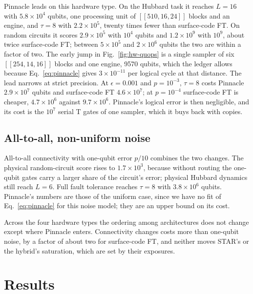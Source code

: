 \documentclass[11pt]{article}
\newcommand{\eps}{\epsilon}
\begin{document}
Pinnacle leads on this hardware type. On the Hubbard task it reaches $L=16$ with
$5.8\times10^4$ qubits, one processing unit of $[[510,16,24]]$ blocks and an
engine, and $\tau=8$ with $2.2\times10^5$, twenty times fewer than surface-code
FT. On random circuits it scores $2.9\times10^5$ with $10^4$ qubits and
$1.2\times10^9$ with $10^9$, about twice surface-code FT; between $5\times10^5$
and $2\times10^6$ qubits the two are within a factor of two. The early jump in
Fig.~\ref{fig:hw-quops} is a single sampler of six $[[254,14,16]]$ blocks and
one engine, 9570 qubits, which the ledger allows because
Eq.~\eqref{eq:pinnacle} gives $3\times10^{-11}$ per logical cycle at that
distance. The lead narrows at strict precision. At $\eps=0.001$ and
$p=10^{-3}$, $\tau=8$ costs Pinnacle $2.9\times10^7$ qubits and surface-code
FT $4.6\times10^7$; at $p=10^{-4}$ surface-code FT is cheaper,
$4.7\times10^6$ against $9.7\times10^6$. Pinnacle's logical error is then
negligible, and its cost is the $10^7$ serial T gates of one sampler, which it
buys back with copies.

\subsection{All-to-all, non-uniform noise}\label{sec:hw-a2a-nonuniform}
All-to-all connectivity with one-qubit error $p/10$ combines the two changes.
The physical random-circuit score rises to $1.7\times10^3$, because without
routing the one-qubit gates carry a larger share of the circuit's error;
physical Hubbard dynamics still reach $L=6$. Full fault tolerance reaches
$\tau=8$ with $3.8\times10^6$ qubits. Pinnacle's numbers are those of the
uniform case, since we have no fit of Eq.~\eqref{eq:pinnacle} for this noise
model; they are an upper bound on its cost.

Across the four hardware types the ordering among architectures does not change
except where Pinnacle enters. Connectivity changes costs more than one-qubit
noise, by a factor of about two for surface-code FT, and neither moves STAR's
or the hybrid's saturation, which are set by their exposures.

\section{Results}\label{sec:results}
\end{document}
